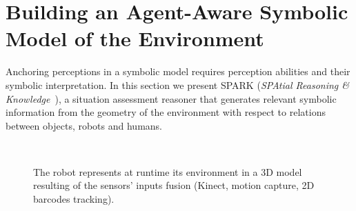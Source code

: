 \documentclass{svmult}
\begin{document}

\section{Building an Agent-Aware Symbolic Model of the Environment}
\label{sec:situ}

Anchoring perceptions in a symbolic model requires perception abilities and
their symbolic interpretation. In this section we present SPARK (\emph{SPAtial
Reasoning \& Knowledge}~\cite{Sisbot2011}), a situation assessment reasoner
that generates relevant symbolic information from the geometry of the
environment with respect to relations between objects, robots and humans.

\begin{figure}[ht!]
   \begin{center}
%
       \\ %
%
   \end{center}

   \caption{The robot represents at runtime its environment in a 3D model
   resulting of the sensors' inputs fusion (Kinect, motion capture, 2D barcodes
   tracking).}

   \label{fig|spark}

\end{figure}
\end{document}
